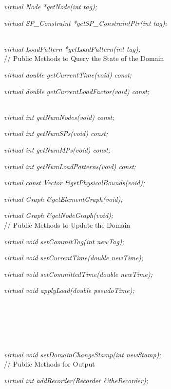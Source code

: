 {\em virtual  Node *getNode(int tag);}

{\em virtual  SP\_Constraint *getSP\_ConstraintPtr(int tag);}

\\ 
{\em virtual  LoadPattern *getLoadPattern(int tag);} \\ 

// Public Methods to Query the State of the Domain 

{\em virtual double getCurrentTime(void) const;} 

{\em virtual double getCurrentLoadFactor(void) const;} 

\\ 
{\em virtual int getNumNodes(void) const;}

{\em virtual int getNumSPs(void) const;}

{\em virtual int getNumMPs(void) const;}

{\em virtual int getNumLoadPatterns(void) const;}

{\em virtual const Vector \&getPhysicalBounds(void);} 

{\em virtual Graph \&getElementGraph(void);} 

{\em virtual Graph \&getNodeGraph(void);} \\ 

// Public Methods to Update the Domain  

{\em virtual void setCommitTag(int newTag);} 

{\em virtual void setCurrentTime(double newTime);} 

{\em virtual void setCommittedTime(double newTime);} 

{\em virtual void applyLoad(double pseudoTime);} 

 \\ 
 \\ 
 \\ 
 \\ 
 \\ 
{\em virtual void setDomainChangeStamp(int newStamp);}\\

// Public Methods for Output 

{\em virtual  int  addRecorder(Recorder \&theRecorder);}

